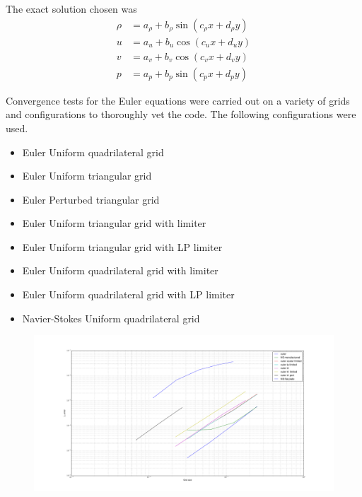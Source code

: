\documentclass[12pt,parskip=full]{article}
\numberwithin{subsection}{section}
\begin{document}
		The exact solution chosen was
		\begin{align}
			\rho &= a_\rho + b_\rho \sin(c_\rho x + d_\rho y) \\
			u &= a_u + b_u \cos(c_u x + d_u y) \\
			v &= a_v + b_v \cos(c_v x + d_v y) \\
			p &= a_p + b_p \sin(c_p x + d_p y)
		\end{align}

		Convergence tests for the Euler equations were carried out on a variety of grids and configurations to thoroughly vet the code. The following
		configurations were used.
		
		\begin{itemize}
			\item Euler Uniform quadrilateral grid
			\item Euler Uniform triangular grid
			\item Euler Perturbed triangular grid
			\item Euler Uniform triangular grid with limiter
			\item Euler Uniform triangular grid with LP limiter
			\item Euler Uniform quadrilateral grid with limiter
			\item Euler Uniform quadrilateral grid with LP limiter
			\item Navier-Stokes Uniform quadrilateral grid
		\end{itemize}
		
		\begin{figure}[H]
			\includegraphics[width=\textwidth]{ConvergencePlot.pdf}
		\end{figure}
\end{document}
